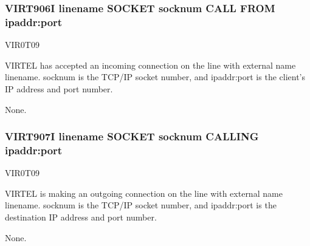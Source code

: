 \documentclass[letterpaper,10pt,english]{sphinxmanual}
\begin{document}
\subsubsection{VIRT906I linename SOCKET socknum CALL FROM ipaddr:port}
\label{\detokenize{messages:virt906i-linename-socket-socknum-call-from-ipaddr-port}}\begin{description}
\sphinxAtStartPar
VIR0T09

\sphinxAtStartPar
VIRTEL has accepted an incoming connection on the line with external name linename. socknum is the TCP/IP socket number, and ipaddr:port is the client’s IP address and port number.

\sphinxAtStartPar
None.

\end{description}


\subsubsection{VIRT907I linename SOCKET socknum CALLING ipaddr:port}
\label{\detokenize{messages:virt907i-linename-socket-socknum-calling-ipaddr-port}}\begin{description}
\sphinxAtStartPar
VIR0T09

\sphinxAtStartPar
VIRTEL is making an outgoing connection on the line with external name linename. socknum is the TCP/IP socket number, and ipaddr:port is the destination IP address and port number.

\sphinxAtStartPar
None.

\end{description}
\end{document}
